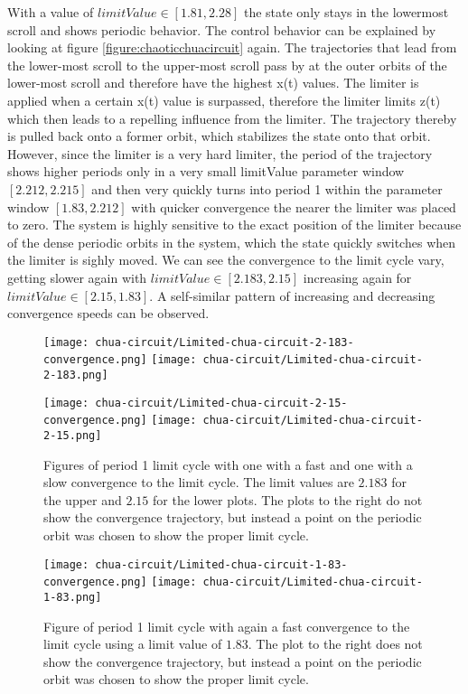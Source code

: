 \documentclass[main]{subfiles}
\begin{document}
With a value of \(limitValue \in [1.81, 2.28]\) the state only stays in the lowermost scroll and shows periodic behavior. The control behavior can be explained by looking at figure \ref{figure:chaoticchuacircuit} again. The trajectories that lead from the lower-most scroll to the upper-most scroll pass by at the outer orbits of the lower-most scroll and therefore have the highest x(t) values. The limiter is applied when a certain x(t) value is surpassed, therefore the limiter limits z(t) which then leads to a repelling influence from the limiter. The trajectory thereby is pulled back onto a former orbit, which stabilizes the state onto that orbit. However, since the limiter is a very hard limiter, the period of the trajectory shows higher periods only in a very small limitValue parameter window \([2.212,2.215]\) and then very quickly turns into period 1 within the parameter window \([1.83,2.212]\) with quicker convergence the nearer the limiter was placed to zero. The system is highly sensitive to the exact position of the limiter because of the dense periodic orbits in the system, which the state quickly switches when the limiter is sighly moved. We can see the convergence to the limit cycle vary, getting slower again with \(limitValue \in [2.183,2.15]\) increasing again for \(limitValue \in [2.15,1.83]\). A self-similar pattern of increasing and decreasing convergence speeds can be observed.

\begin{figure}[H]
\centering
\texttt{[image: chua-circuit/Limited-chua-circuit-2-183-convergence.png]}
\texttt{[image: chua-circuit/Limited-chua-circuit-2-183.png]}

\texttt{[image: chua-circuit/Limited-chua-circuit-2-15-convergence.png]}
\texttt{[image: chua-circuit/Limited-chua-circuit-2-15.png]}
\caption[Figure of period 1 limit cycle]{Figures of period 1 limit cycle with one with a fast and one with a slow convergence to the limit cycle. The limit values are \(2.183\) for the upper and \(2.15\) for the lower plots. The plots to the right do not show the convergence trajectory, but instead a point on the periodic orbit was chosen to show the proper limit cycle.}
\label{figure:chaotictrajectories}
\end{figure}

\begin{figure}[H]
\centering
\texttt{[image: chua-circuit/Limited-chua-circuit-1-83-convergence.png]}
\texttt{[image: chua-circuit/Limited-chua-circuit-1-83.png]}
\caption[Figure of period 1 limit cycle]{Figure of period 1 limit cycle with again a fast convergence to the limit cycle using a limit value of \(1.83\). The plot to the right does not show the convergence trajectory, but instead a point on the periodic orbit was chosen to show the proper limit cycle.}
\label{figure:chaotictrajectories}
\end{figure}
\end{document}
